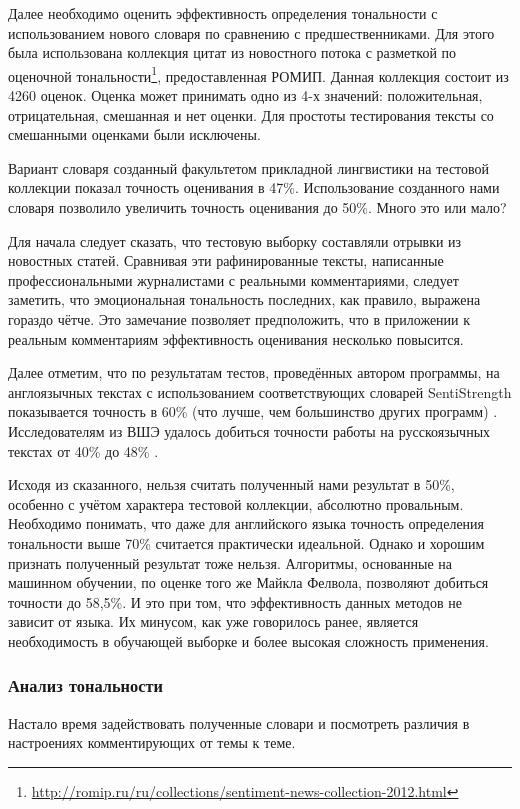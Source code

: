 Далее необходимо оценить эффективность определения тональности с использованием нового словаря по сравнению с предшественниками. Для этого была использована коллекция цитат из новостного потока с разметкой по оценочной тональности\footnote{\href{http://romip.ru/ru/collections/sentiment-news-collection-2012.html}{http://romip.ru/ru/collections/sentiment-news-collection-2012.html}}, предоставленная РОМИП. Данная коллекция состоит из 4260 оценок. Оценка может принимать одно из 4-х значений: положительная, отрицательная, смешанная и нет оценки. Для простоты тестирования тексты со смешанными оценками были исключены.

Вариант словаря созданный факультетом прикладной лингвистики на тестовой коллекции показал точность оценивания в 47\%. Использование созданного нами словаря позволило увеличить точность оценивания до 50\%. Много это или мало?

Для начала следует сказать, что тестовую выборку составляли отрывки из новостных статей. Сравнивая эти рафинированные тексты, написанные профессиональными журналистами с реальными комментариями, следует заметить, что эмоциональная тональность последних, как правило, выражена гораздо чётче. Это замечание позволяет предположить, что в приложении к реальным комментариям эффективность оценивания несколько повысится.

Далее отметим, что по результатам тестов, проведённых автором программы, на англоязычных текстах с использованием соответствующих словарей SentiStrength показывается точность в 60\% (что лучше, чем большинство других программ) \cite{SentiStrength}. Исследователям из ВШЭ удалось добиться точности работы на русскоязычных текстах от 40\% до 48\% \cite[стр. 49]{kolcova_sentistrength}.

Исходя из сказанного, нельзя считать полученный нами результат в 50\%, особенно с учётом характера тестовой коллекции, абсолютно провальным. Необходимо понимать, что даже для английского языка точность определения тональности выше 70\% считается практически идеальной. Однако и хорошим признать полученный результат тоже нельзя. Алгоритмы, основанные на машинном обучении, по оценке того же Майкла Фелвола, позволяют добиться точности до 58,5\%. И это при том, что эффективность данных методов не зависит от языка. Их минусом, как уже говорилось ранее, является необходимость в обучающей выборке и более высокая сложность применения.

\subsubsection{Анализ тональности}

Настало время задействовать полученные словари и посмотреть различия в настроениях комментирующих от темы к теме.
\clearpage
